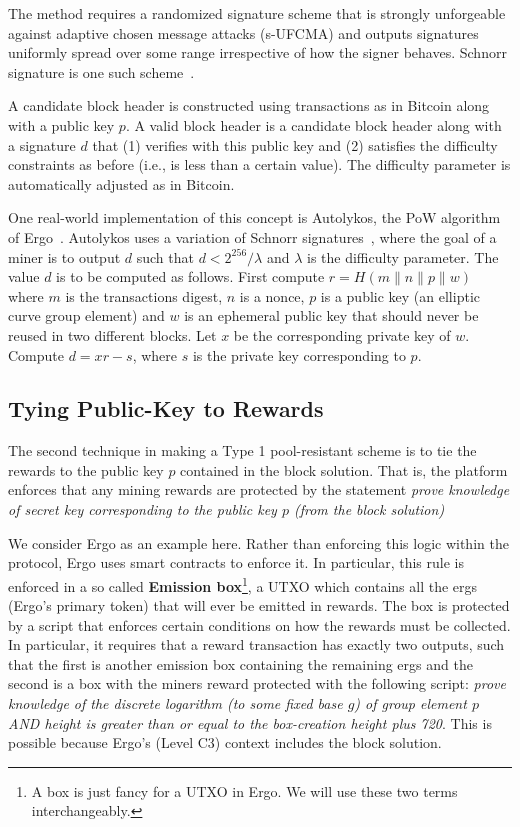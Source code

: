 \documentclass[runningheads]{llncs}
\newcommand{\powname}{Autolykos\xspace}
\begin{document}
The method requires a randomized signature scheme that is strongly unforgeable against adaptive chosen message attacks (s-UFCMA) and outputs signatures uniformly spread over some range irrespective of how the signer behaves. Schnorr signature is one such scheme~\cite{Sch91}.

A candidate block header is constructed using transactions as in Bitcoin along with a public key $p$. A valid block header is a candidate block header along with a signature $d$ that (1) verifies with this public key and (2) satisfies the difficulty constraints as before (i.e., is less than a certain value). The difficulty parameter is automatically adjusted as in Bitcoin.

One real-world implementation of this concept is \powname \cite{autolykos}, the PoW algorithm of Ergo~\cite{ergo}. \powname uses a variation of Schnorr signatures~\cite{Sch91}, where the goal of a miner is to output $d$ such that $d < 2^{256}/\lambda$ and $\lambda$ is the difficulty parameter. The value $d$ is to be computed as follows. First compute $r = H(m\|n\|p\|w)$ where $m$ is the transactions digest, $n$ is a nonce, $p$ is a public key (an elliptic curve group element) and $w$ is an ephemeral public key that should never be reused in two different blocks. Let $x$ be the corresponding private key of $w$. Compute $d = xr - s$, where $s$ is the private key corresponding to $p$.


\subsection{Tying Public-Key to Rewards}

The second technique in making a Type 1 pool-resistant scheme is to tie the rewards to the public key $p$ contained in the block solution. That is, the platform enforces that any mining rewards are protected by the statement {\em prove knowledge of secret key corresponding to the public key $p$ (from the block solution)}

We consider Ergo as an example here. Rather than enforcing this logic within the protocol, Ergo uses smart contracts to enforce it. In particular, this rule is enforced in a so called \textbf{Emission box}\footnote{A box is just fancy for a UTXO in Ergo. We will use these two terms interchangeably.}, a UTXO which contains all the ergs (Ergo's primary token) that will ever be emitted in rewards. The box is protected by a script that enforces certain conditions on how the rewards must be collected. In particular, it requires that a reward transaction has exactly two outputs, such that the first is another emission box containing the remaining ergs and the second is a box with the miners reward protected with the following script: {\em prove knowledge of the discrete logarithm (to some fixed base $g$) of group element $p$ AND height is greater than or equal to the box-creation height plus 720}.
This is possible because Ergo's (Level C3) context includes the block solution.  
\end{document}
